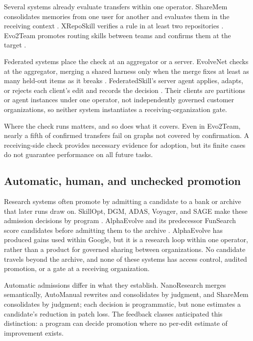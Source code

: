 \documentclass[
  11pt,
]{article}
\newcounter{none} %
\begin{document}
Several systems already evaluate transfers within one operator. ShareMem consolidates memories from one user for another and evaluates them in the receiving context \cite{hu2026sharemem}. XRepoSkill verifies a rule in at least two repositories \cite{guo2026xreposkill}. Evo2Team promotes routing skills between teams and confirms them at the target \cite{wang2026evo2team}.

Federated systems place the check at an aggregator or a server. EvolveNet checks at the aggregator, merging a shared harness only when the merge fixes at least as many held-out items as it breaks \cite{nie2026evolvenet}. FederatedSkill's server agent applies, adapts, or rejects each client's edit and records the decision \cite{yang2026federatedskill}. Their clients are partitions or agent instances under one operator, not independently governed customer organizations, so neither system instantiates a receiving-organization gate.

Where the check runs matters, and so does what it covers. Even in Evo2Team, nearly a fifth of confirmed transfers fail on graphs not covered by confirmation. A receiving-side check provides necessary evidence for adoption, but its finite cases do not guarantee performance on all future tasks.

\subsection{Automatic, human, and unchecked promotion}\label{automatic-human-and-unchecked-promotion}

Research systems often promote by admitting a candidate to a bank or archive that later runs draw on. SkillOpt, DGM, ADAS, Voyager, and SAGE make these admission decisions by program \cite{yang2026skillopt, zhang2025darwin, hu2024adas, wang2023voyager, wang2025sage}. AlphaEvolve and its predecessor FunSearch score candidates before admitting them to the archive \cite{alphaevolve2025, romeraparedes2024funsearch}. AlphaEvolve has produced gains used within Google, but it is a research loop within one operator, rather than a product for governed sharing between organizations. No candidate travels beyond the archive, and none of these systems has access control, audited promotion, or a gate at a receiving organization.

Automatic admissions differ in what they establish. NanoResearch merges semantically, AutoManual rewrites and consolidates by judgment, and ShareMem consolidates by judgment; each decision is programmatic, but none estimates a candidate's reduction in patch loss. The feedback classes anticipated this distinction: a program can decide promotion where no per-edit estimate of improvement exists.
\end{document}

